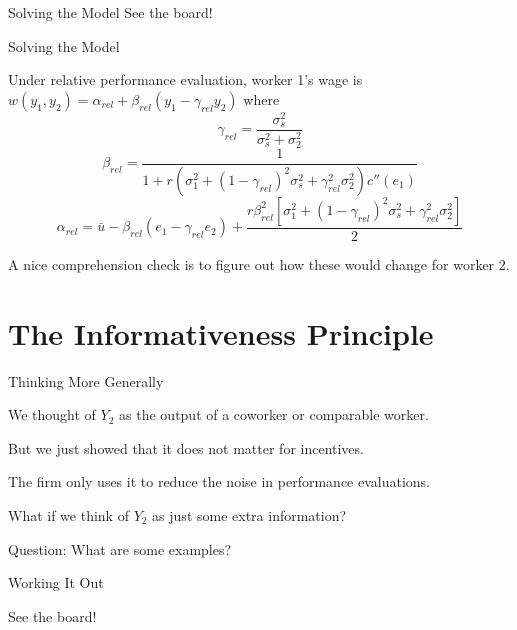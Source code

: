 \documentclass[aspectratio=169,usenames,dvipsnames]{beamer}
\newenvironment{wideitemize}{\itemize\addtolength{\itemsep}{10pt}}{\enditemize}
\begin{document}
\begin{frame}{Solving the Model}
    \huge See the board!
\end{frame}

\begin{frame}{Solving the Model}
      \begin{theorem}
       Under relative performance evaluation, worker 1's wage is $w(y_1, y_2)=\alpha_{rel} + \beta_{rel} (y_1 - \gamma_{rel} y_2)$ where
      \[\gamma_{rel}=\frac{\sigma^2_s}{\sigma^2_s + \sigma^2_2}\]
 \[  \beta_{rel}=\frac{1}{1+r  ( \sigma_1^2+ (1-\gamma_{rel})^2\sigma_s^2 +\gamma_{rel}^2 \sigma_2^2 )c''(e_1)}\]
 \[\alpha_{rel} = \bar u - \beta_{rel}(e_1-\gamma_{rel} e_2) + \frac{r\beta_{rel}^2[\sigma_1^2 + (1-\gamma_{rel})^2\sigma^2_s + \gamma_{rel}^2\sigma^2_2] }{2}   \]
    \end{theorem}

    \footnotesize A nice comprehension check is to figure out how these would change for worker 2.
\end{frame}



\section{The Informativeness Principle}

\begin{frame}{Thinking More Generally}

\begin{wideitemize}
    \item We thought of $Y_2$ as the output of a coworker or comparable worker.
    \item But we just showed that it does not matter for incentives.
    \item The firm only uses it to reduce the noise in performance evaluations.
    \item What if we think of $Y_2$ as just some extra information?
    \begin{wideitemize}
        \item Question: What are some examples?
    \end{wideitemize}
\end{wideitemize}
\end{frame}

\begin{frame}{Working It Out}

\huge See the board!
    
\end{frame}
\end{document}
